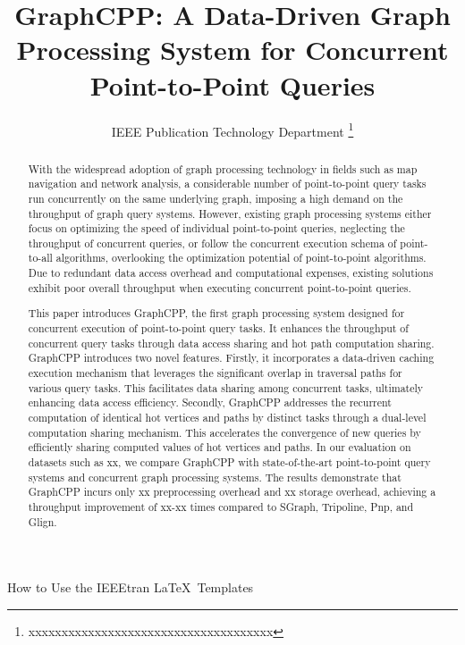 \documentclass[lettersize,journal]{IEEEtran} %
\begin{document}
\title{GraphCPP: A Data-Driven Graph Processing System for Concurrent Point-to-Point Queries} %
\author{IEEE Publication Technology Department %
\thanks{xxxxxxxxxxxxxxxxxxxxxxxxxxxxxxxxxxxxx}} %

{How to Use the IEEEtran \LaTeX \ Templates} 

\maketitle %

\graphicspath{{E:/华科实验室论文/MyDocument/并发点对点查询/论文草稿/picture/}}


\begin{abstract} %
With the widespread adoption of graph processing technology in fields such as map navigation and network analysis, a considerable number of point-to-point query tasks run concurrently on the same underlying graph, imposing a high demand on the throughput of graph query systems. However, existing graph processing systems either focus on optimizing the speed of individual point-to-point queries, neglecting the throughput of concurrent queries, or follow the concurrent execution schema of point-to-all algorithms, overlooking the optimization potential of point-to-point algorithms. Due to redundant data access overhead and computational expenses, existing solutions exhibit poor overall throughput when executing concurrent point-to-point queries.

This paper introduces GraphCPP, the first graph processing system designed for concurrent execution of point-to-point query tasks. It enhances the throughput of concurrent query tasks through data access sharing and hot path computation sharing. GraphCPP introduces two novel features. Firstly, it incorporates a data-driven caching execution mechanism that leverages the significant overlap in traversal paths for various query tasks. This facilitates data sharing among concurrent tasks, ultimately enhancing data access efficiency. Secondly, GraphCPP addresses the recurrent computation of identical hot vertices and paths by distinct tasks through a dual-level computation sharing mechanism. This accelerates the convergence of new queries by efficiently sharing computed values of hot vertices and paths. In our evaluation on datasets such as xx, we compare GraphCPP with state-of-the-art point-to-point query systems and concurrent graph processing systems. The results demonstrate that GraphCPP incurs only xx preprocessing overhead and xx storage overhead, achieving a throughput improvement of xx-xx times compared to SGraph, Tripoline, Pnp, and Glign.
  
\end{abstract}
\end{document}
